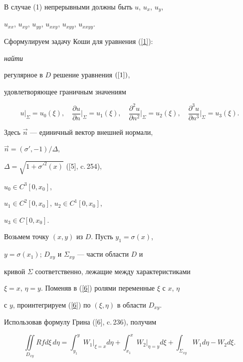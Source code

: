 В случае (1) непрерывными должны быть $u$, $u_{x}$, $u_{y}$,


$u_{xx}$, $u_{xy}$, $u_{yy}$, $u_{xxy}$, $u_{xyy}$, $u_{xxyy}$.





Сформулируем задачу Коши для уравнения (\ref{1}): {\it найти


регулярное в $D$ решение уравнения $(\ref{1})$, 


удовлетворяющее граничным значениям}


\begin{equation}\label{7}


u\big\vert_{\Sigma}=u_{0}(\xi),\quad


\frac{\partial u}{\partial n}\Big\vert_{\Sigma}=u_{1}(\xi), \quad


\frac{\partial^2 u}{\partial n^2}\Big\vert_{\Sigma}=


u_{2}(\xi),\quad


\frac{\partial^3 u}{\partial n^3}\Big\vert_{\Sigma}=u_{3}(\xi).


\end{equation}


Здесь $\Vec n$ --- единичный вектор внешней нормали,


$\Vec n = (\sigma',-1)/\Delta$,


$\Delta=\sqrt{1+{\sigma'}^{2}(x)}$ ([5], c.\,254),


$u_{0}\in C^{3}[0,x_{0}]$,


$u_{1}\in C^{2}[0,x_{0}]$, $u_{2}\in C^{1}[0,x_{0}]$,


$u_{3}\in C[0,x_{0}]$.





Возьмем точку $(x,y)$ из $D$. Пусть $y_{1}=\sigma(x)$,


$y=\sigma(x_{1})$; $D_{xy}$ и $\Sigma_{xy}$ --- части области $D$ и


кривой $\Sigma$ соответственно, лежащие между характеристиками


$\xi=x$, $\eta=y$. Поменяв в (\ref{6}) ролями переменные $\xi$ с $x$, $\eta$


с $y$, проинтегрируем (\ref{6}) по $(\xi,\eta)$ в области $D_{xy}$.


Использовав формулу Грина ([6], c.\,236), получим


\begin{equation}\label{8}


\iint\limits_{D_{xy}} Rfd\xi\,d\eta =


\int_{y_{1}}^{y} W_1 \big\vert_{\xi=x} d\eta


+\int_{x_{1}}^{x} W_2 \big\vert_{\eta=y} d\xi


+\int_{\Sigma_{xy}} W_1 d\eta - W_2 d\xi .


\end{equation}





